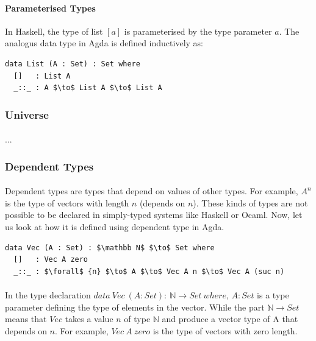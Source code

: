 \documentclass[twoside,openright,final]{bhamthesis}
\begin{document}
\paragraph{Parameterised Types} In Haskell, the type of list \([a]\) is parameterised by the type
parameter \(a\). The analogus data type in Agda is defined inductively as:
\begin{lstlisting}[mathescape=true,xleftmargin=.3\textwidth]
data List (A : Set) : Set where
  []   : List A
  _::_ : A $\to$ List A $\to$ List A
\end{lstlisting} 

\subsubsection{Universe}
\paragraph{} ...

\subsubsection{Dependent Types}
\paragraph{} Dependent types are types that depend on values of other
types. For example, \(A^n\) is the type of vectors with
length \(n\) (depends on \(n\)). These kinds of types are not possible
to be declared in simply-typed systems like Haskell or Ocaml. Now, let
us look at how it is defined using dependent type in Agda. 
\begin{lstlisting}[mathescape=true,xleftmargin=.25\textwidth]
data Vec (A : Set) : $\mathbb N$ $\to$ Set where
  []   : Vec A zero
  _::_ : $\forall$ {n} $\to$ A $\to$ Vec A n $\to$ Vec A (suc n)
\end{lstlisting} 

\paragraph{} In the type declaration \(data\ Vec\ (A : Set) :\ \mathbb N \to
Set\ where\), \(A : Set\) is a type parameter defining the type of
elements in the vector. While the part \(\mathbb N \to Set\) means
that \(Vec\) takes a value \(n\) of type \(\mathbb N\) and produce a
vector type of A that depends on \(n\). For example, \(Vec\ A\ zero\) is the type of vectors with
zero length. 
\end{document}

